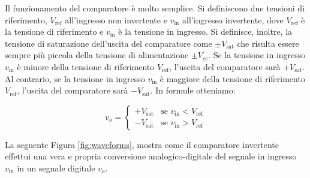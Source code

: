 \documentclass[a4paper,12pt]{report}  %
\begin{document}
Il funzionamento del comparatore è molto semplice.
Si definiscono due tensioni di riferimento, $V_{\text{ref}}$ all'ingresso non invertente e $v_{\text{in}}$ all'ingresso invertente, dove $V_{\text{ref}}$ è la tensione di riferimento e $v_{\text{in}}$ è la tensione in ingresso.
Si definisce, inoltre, la tensione di saturazione dell'uscita del comparatore come $\pm V_{\text{sat}}$ che risulta essere sempre più piccola della tensione di alimentazione $\pm V_{cc}$.
Se la tensione in ingresso $v_{\text{in}}$ è minore della tensione di riferimento $V_{\text{ref}}$, l'uscita del comparatore sarà $+V_{\text{sat}}$.
Al contrario, se la tensione in ingresso $v_{\text{in}}$ è maggiore della tensione di riferimento $V_{\text{ref}}$, l'uscita del comparatore sarà $-V_{\text{sat}}$.
In formule otteniamo:

\begin{equation}
    v_{o} = \begin{cases}
        +V_{\text{sat}} & \text{se } v_{\text{in}} < V_{\text{ref}} \\
        -V_{\text{sat}} & \text{se } v_{\text{in}} > V_{\text{ref}}
    \end{cases} \label{eq:comparatore}
\end{equation}

La seguente Figura \ref{fig:waveforms}, mostra come il comparatore invertente effettui una vera e propria conversione analogico-digitale del segnale in ingresso $v_{\text{in}}$ in un segnale digitale $v_{o}$.
\end{document}
